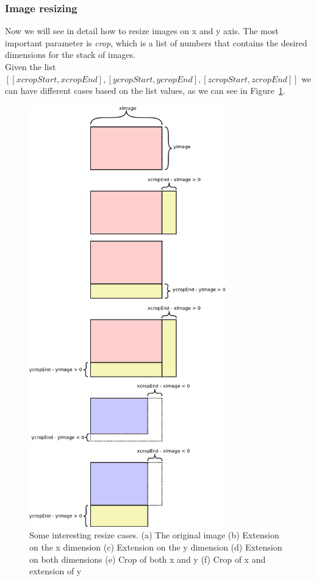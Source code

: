 \documentclass[11pt,oneside]{article}	%
\begin{document}
\subsubsection{Image resizing}\label{sec:imageResize}

Now we will see in detail how to resize images on x and y axis. The most important parameter is \textit{crop}, which is a list of numbers that contains the desired dimensions for the stack of images.\\ Given the list $[[xcropStart, xcropEnd],[ycropStart, ycropEnd],[zcropStart, zcropEnd]]$ we can have different cases based on the list values, as we can see in Figure~\ref{fig:resizeCases}.

\begin{figure}[htbp] %
   \centering
   \includegraphics[width=8.5cm]{images/resizeCases.png} \hfill
   \caption{Some interesting resize cases. (a) The original image (b) Extension on the x dimension (c) Extension on the y dimension (d) Extension on both dimensions (e) Crop of both x and y (f) Crop of x and extension of y}
   \label{fig:resizeCases}
\end{figure}
\end{document}
